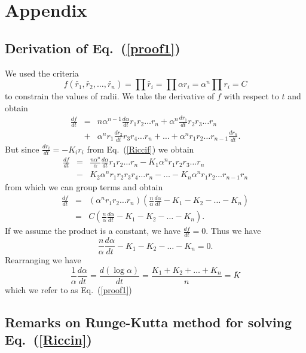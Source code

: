 \documentclass[12pt]{article}
\begin{document}
\newpage
\section{Appendix}

\subsection{Derivation of Eq.~(\ref{proof1})}
\maketitle
	
	We used the criteria $$f(\tilde{r_1},\tilde{r_2},\ldots,\tilde{r_n}) = \prod{\tilde{r_i}} = \prod{\alpha r_i} = \alpha^n\prod{r_i}= C$$ to constrain the values of radii. We take the derivative of $f$ with respect to $t$ and obtain
	\begin{eqnarray*}
	\frac{df}{dt} & = & n\alpha^{n-1}\frac{d\alpha}{dt}r_1r_2\ldots r_n + \alpha^n\frac{dr_1}{dt}r_2r_3\ldots r_n\\
								& + & \alpha^nr_1\frac{dr_2}{dt}r_3r_4\ldots r_n + \ldots + \alpha^nr_1r_2\ldots r_{n-1}\frac{dr_n}{dt}.
	\end{eqnarray*}
	But since $\displaystyle \frac{dr_i}{dt} = -K_ir_i$ from Eq.~(\ref{Riccif}) we obtain
	\begin{eqnarray*}
	\frac{df}{dt} & = & \frac{n\alpha^{n}}{\alpha}\frac{d\alpha}{dt}r_1r_2\ldots r_n - K_1\alpha^nr_1r_2r_3\ldots r_n\\
								& - & K_2\alpha^nr_1r_2r_3r_4\ldots r_n - \ldots - K_n\alpha^nr_1r_2\ldots r_{n-1}r_n
	\end{eqnarray*}
	from which we can group terms and obtain
	\begin{eqnarray*}
	\frac{df}{dt} & = & (\alpha^nr_1r_2\ldots r_n)(\frac{n}{\alpha}\frac{d\alpha}{dt} - K_1 - K_2 - \ldots - K_n)\\
								& = & C(\frac{n}{\alpha}\frac{d\alpha}{dt} - K_1 - K_2 - \ldots - K_n).
	\end{eqnarray*}
	If we assume the product is a constant, we have $\displaystyle \frac{df}{dt} = 0.$ Thus we have $$\frac{n}{\alpha}\frac{d\alpha}{dt} - K_1 - K_2 - \ldots - K_n = 0.$$
	Rearranging we have
$$\frac{1}{\alpha}\frac{d\alpha}{dt} = \frac{d(\log \alpha)}{dt} = \frac{K_1 + K_2 + \ldots + K_n}{n} = \overline{K}$$
	which we refer to as Eq.~(\ref{proof1})
  
  \subsection{Remarks on Runge-Kutta method for solving Eq.~(\ref{Riccin})}
	\maketitle
\end{document}
